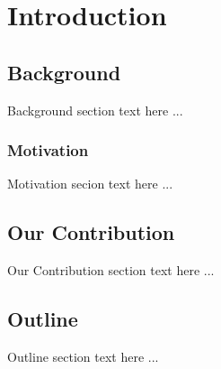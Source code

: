 \chapter{Introduction} \label{chap:Introduction}

\section{Background}

Background section text here ...

\subsection{Motivation}

Motivation secion text here ...

\section{Our Contribution}

Our Contribution section text here ...

\section{Outline}

Outline section text here ...
